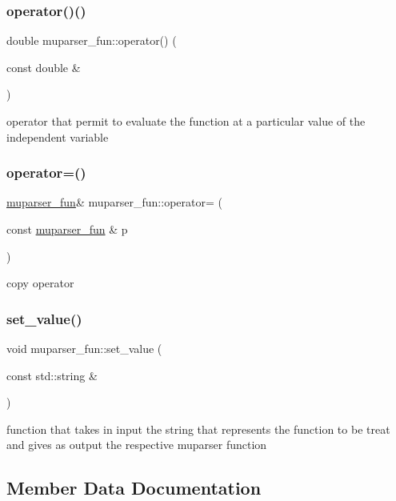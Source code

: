\subsubsection{\texorpdfstring{operator()()}{operator()()}}
{\footnotesize\ttfamily double muparser\+\_\+fun\+::operator() (\begin{DoxyParamCaption}\item[{const double \&}]{ }\end{DoxyParamCaption})}

operator that permit to evaluate the function at a particular value of the independent variable \mbox{\label{classmuparser__fun_a6e4082f4ba40e947b734195a337823d9}} 
\subsubsection{\texorpdfstring{operator=()}{operator=()}}
{\footnotesize\ttfamily \hyperlink{classmuparser__fun}{muparser\+\_\+fun}\& muparser\+\_\+fun\+::operator= (\begin{DoxyParamCaption}\item[{const \hyperlink{classmuparser__fun}{muparser\+\_\+fun} \&}]{p }\end{DoxyParamCaption})}

copy operator \mbox{\label{classmuparser__fun_a1e7855a7285191f81deddf262cac949a}} 
\subsubsection{\texorpdfstring{set\+\_\+value()}{set\_value()}}
{\footnotesize\ttfamily void muparser\+\_\+fun\+::set\+\_\+value (\begin{DoxyParamCaption}\item[{const std\+::string \&}]{ }\end{DoxyParamCaption})}

function that takes in input the string that represents the function to be treat and gives as output the respective muparser function 

\subsection{Member Data Documentation}
\mbox{\label{classmuparser__fun_ad94fb029c66d186b6fe278b51df8dfc4}} 

